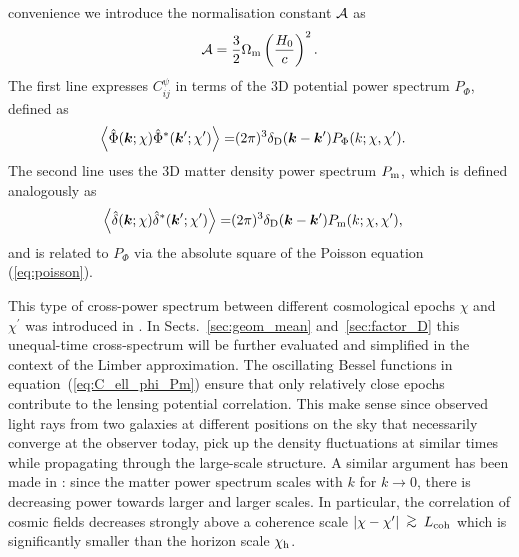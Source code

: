 \documentclass[fleqn,usenatbib]{mnras} %
\newcommand{\pref}{{\cal A}}
\renewcommand{\vec}{\bm}
\newcommand{\ontop}[2]{
  \renewcommand{\arraystretch}{0.2}
  \begin{array}{c}
  #1 \\ #2
  \end{array}
  \renewcommand{\arraystretch}{1.0}
}
\newcommand{\gsim}{\ontop{>}{\sim}}
\begin{document}
convenience we introduce the normalisation constant $\pref$ as
%
\begin{equation}
  \pref = \frac 3 2 \Omega_{\rm m} \left(\frac{H_0} c\right)^2.
  \label{eq:pref}
\end{equation}
%
The first line expresses $C_{ij}^\psi$ in terms of the 3D potential power spectrum $P_\Phi$, defined as
%
\begin{align}
  \left\langle \hat \Phi(\vec k; \chi) \hat \Phi^\ast(\vec k^\prime; \chi^\prime) \right\rangle
    = & (2\pi)^3 \delta_{\rm D}(\vec k - \vec k^\prime) P_\Phi(k; \chi, \chi^\prime).
  \label{eq:p_phi}
\end{align}
%
The second line uses the 3D matter density power spectrum $P_{\rm m}$, which is defined analogously as
%
\begin{align}
  \left\langle \hat \delta(\vec k; \chi) \hat \delta^\ast(\vec k^\prime; \chi^\prime) \right\rangle
    = & (2\pi)^3 \delta_{\rm D}(\vec k - \vec k^\prime) P_{\rm m}(k; \chi, \chi^\prime),
  \label{eq:p_m}
\end{align}
%
and is related to $P_\Phi$ via the absolute square of the Poisson equation
(\ref{eq:poisson}).

This type of cross-power spectrum between different cosmological epochs
$\chi$ and $\chi^\prime$ was introduced in \cite{2005PhRvD..72b3516C}. In
Sects.~\ref{sec:geom_mean} and~\ref{sec:factor_D} this unequal-time
cross-spectrum \citep{2016arXiv161200770K} will be further evaluated and
simplified in the context of the Limber approximation. The oscillating Bessel
functions in equation~(\ref{eq:C_ell_phi_Pm}) ensure that only relatively close epochs
contribute to the lensing potential correlation. This make sense since observed
light rays from two galaxies at different positions on the sky that necessarily
converge at the observer today, pick up the density fluctuations at similar
times while propagating through the large-scale structure. A similar argument
has been made in \cite{BS01}: since the matter power spectrum scales with $k$
for $k \rightarrow 0$, there is decreasing power towards larger and larger
scales. In particular, the correlation of cosmic fields decreases strongly
above a coherence scale $|\chi - \chi^\prime| \gsim L_{\rm coh}$ which is significantly
smaller than the horizon scale $\chi_{\rm h}$.
\end{document}
